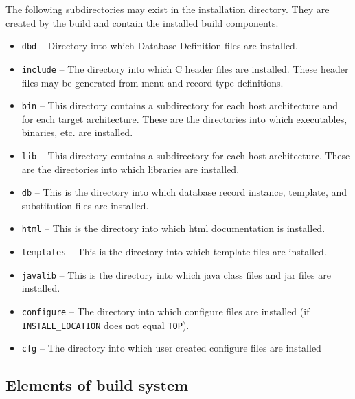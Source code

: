 The following subdirectories may exist in the installation directory. They are created by the build and contain the installed 
build components.

\begin{itemize}
\item {}\verb|dbd| -- Directory into which Database Definition files are installed.

\item {}\verb|include| -- The directory into which C header files are installed. These header files may be generated from menu and 
record type definitions.

\item {}\verb|bin| -- This directory contains a subdirectory for each host architecture and for each target architecture. These are the 
directories into which executables, binaries, etc. are installed.

\item {}\verb|lib| -- This directory contains a subdirectory for each host architecture. These are the directories into which libraries 
are installed.

\item {}\verb|db| -- This is the directory into which database record instance, template, and substitution files are installed.

\item {}\verb|html| -- This is the directory into which html documentation is installed.

\item {}\verb|templates| -- This is the directory into which template files are installed.

\item {}\verb|javalib| -- This is the directory into which java class files and jar files are installed.

\item {}\verb|configure| -- The directory into which configure files are installed (if \verb|INSTALL_LOCATION| does not equal \verb|TOP|).

\item {}\verb|cfg| -- The directory into which user created configure files are installed 
\end{itemize}

\subsection{Elements of build system}

